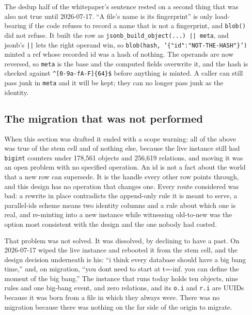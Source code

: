 The dedup half of the whitepaper's sentence rested on a second thing that was also not true until 2026-07-17. ``A file's name is its fingerprint'' is only load-bearing if the code refuses to record a name that is not a fingerprint, and \texttt{blob()} did not refuse. It built the row as \texttt{jsonb\_build\_object(...) || meta}, and jsonb's \texttt{||} lets the right operand win, so \texttt{blob(hash, '\{"id":"NOT-THE-HASH"\}')} minted a ref whose recorded id was a hash of nothing. The operands are now reversed, so \texttt{meta} is the base and the computed fields overwrite it, and the hash is checked against \verb|^[0-9a-fA-F]{64}$| before anything is minted. A caller can still pass junk in \texttt{meta} and it will be kept; they can no longer pass junk as the identity.

\subsection{The migration that was not performed}

When this section was drafted it ended with a scope warning: all of the above was true of the stem cell and of nothing else, because the live instance still had \texttt{bigint} counters under 178{,}561 objects and 256{,}619 relations, and moving it was an open problem with no specified operation. An id is not a fact about the world that a new row can supersede. It is the handle every other row points through, and this design has no operation that changes one. Every route considered was bad: a rewrite in place contradicts the append-only rule it is meant to serve, a parallel-ids scheme means two identity columns and a rule about which one is real, and re-minting into a new instance while witnessing old-to-new was the option most consistent with the design and the one nobody had costed.

That problem was not solved. It was dissolved, by declining to have a past. On 2026-07-17 \labPI wiped the live instance and rebooted it from the stem cell, and the design decision underneath is his: ``i think every database should have a big bang time,'' and, on migration, ``you dont need to start at t=-inf. you can define the moment of the big bang.'' The instance that runs today holds ten objects, nine rules and one big-bang event, and zero relations, and its \texttt{o.i} and \texttt{r.i} are UUIDs because it was born from a file in which they always were. There was no migration because there was nothing on the far side of the origin to migrate.

